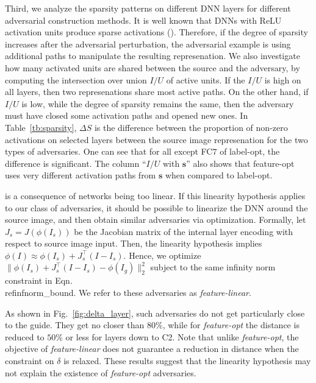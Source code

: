 \documentclass{article} %
\newcommand{\source}{{\boldsymbol{\mathbf{s}}}}\newcommand{\guide}{\boldsymbol{\mathbf{g}}}\newcommand{\adv}{\boldsymbol{\mathbf{\alpha}}}\newcommand{\neigh}[2]{\ensuremath{n_{#1} ({#2})}}\newcommand{\Neighs}[2]{\ensuremath{\mathcal{N}}_{{#1}} ({#2})}\newcommand{\NNavg}[2]{\ensuremath{a_{#1} ({#2})}}\newcommand{\NNz}[2]{\ensuremath{z_{#1} ({#2})}}\newcommand{\class}[1]{C ({#1})}\newcommand{\dist}[2]{\ensuremath{D ({#1}, {#2})}}\newcommand{\rank}[2]{\ensuremath{r_{#1} ({#2})}}\newcommand{\rankdiff}[1]{\ensuremath{\Delta{r_{#1}}}}\newcommand{\dlike}[2]{\ensuremath{\Delta L({#1}, {#2})}}%
\newcommand{\T}{\ensuremath{\top}}
\begin{document}
Third, we analyze the sparsity  patterns on different DNN layers for
different adversarial construction methods. It is well known that DNNs
with ReLU activation units produce sparse activations
(\cite{AISTATS2011_GlorotBB11}).  Therefore, if the degree of sparsity
increases after the adversarial perturbation, the adversarial example
is using additional paths to manipulate the resulting represenation.
We also investigate how many activated units are shared between the source
and the adversary, by computing the intersection over union {\em $I/U$} of
active units. If the $I/U$ is high on all layers, then two represenations
share most active paths. On the other hand, if $I/U$ is low,
while the degree of sparsity remains the same, then the adversary must have
closed some activation paths and opened new ones. In Table~\ref{tb:sparsity},
$\Delta S$ is the difference between the proportion of non-zero activations on
selected layers between the source image represenation for the two types
of adversaries. One can see that for all except FC$7$ of label-opt, the
difference is significant. The column ``$I/U$ with $\source$'' also shows that
feature-opt uses very different activation paths from $\source$ when compared
to label-opt.

is a consequence of networks being too linear.  If this linearity hypothesis
applies to our class of adversaries, it should be possible to linearize the
DNN around the source image, and then obtain similar adversaries via
optimization. Formally, let $J_s = J(\phi(I_s))$ be the Jacobian matrix
of the internal layer encoding with respect to source image input.
Then, the
linearity hypothesis implies $\phi(I) \approx \phi(I_s) + J_s^{\T}(I-I_s)$.
Hence, we optimize $\| \phi(I_s) + J_s^{\T}(I-I_s) - \phi(I_g)\|^2_2$
subject to the same infinity norm constraint in Eqn.\\ref{infnorm_bound}.
We refer to these adversaries as {\em feature-linear}.

As shown in Fig.~\ref{fig:delta_layer}, such adversaries do not get
particularly close to the guide.  They get no closer than 80\%, while
for {\em feature-opt} the distance is reduced to $50\%$ or less
for layers down to C2.  Note that unlike {\em feature-opt}, the objective
of {\em feature-linear} does not guarantee a reduction in distance
when the constraint on $\delta$ is relaxed.  These results suggest that
the linearity hypothesis may not explain the existence of {\em feature-opt}
adversaries.
\end{document}
